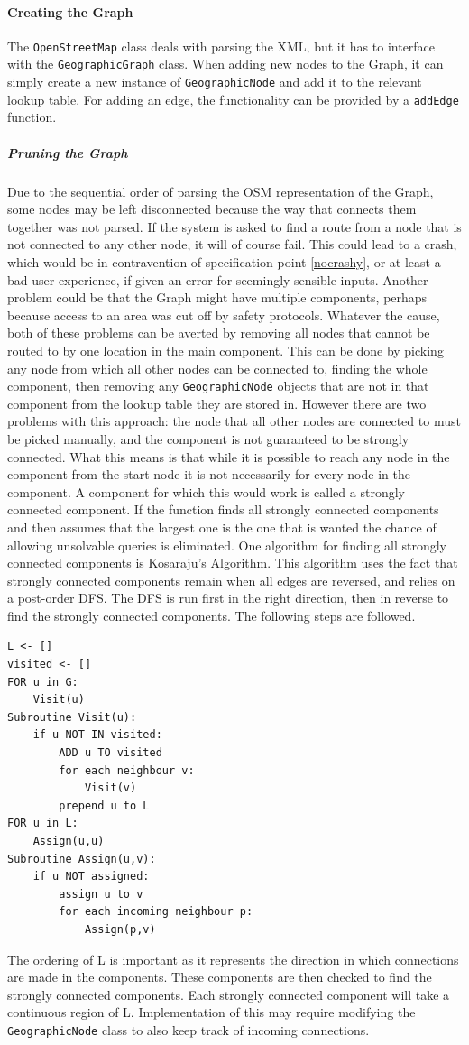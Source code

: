 \documentclass[11pt,twoside,a4paper]{article}
\begin{document}
\paragraph{Creating the Graph}
The \texttt{OpenStreetMap} class deals with parsing the XML, but it has to interface with the \texttt{GeographicGraph} class. When adding new nodes to the Graph, it can simply create a new instance of 
\texttt{GeographicNode} and add it to the relevant lookup table. For adding an edge, the functionality can be provided by a \texttt{addEdge} function. 
\subparagraph{Pruning the Graph}
Due to the sequential order of parsing the OSM representation of the Graph, some nodes may be left disconnected because the way that connects them together was not parsed. If the system is asked to find a route from a 
node that is not connected to any other node, it will of course fail. This could lead to a crash, which would be in contravention of specification point \ref{nocrashy}, or at least a bad user experience, if given an error for seemingly sensible inputs.
Another problem could be that the Graph might have multiple components, perhaps because access to an area was cut off by safety protocols. Whatever the cause, both of these problems can be averted by removing all nodes that cannot be routed to by one location in the 
main component. This can be done by picking any node from which all other nodes can be connected to, finding the whole component, then removing any \texttt{GeographicNode} objects that are not in that component from the lookup table they are stored in. However there are two problems with this approach:
 the node that all other nodes are connected to must be picked manually, and the component is not guaranteed to be strongly connected. What this means is that while it is possible to reach any node in the component from the start node it is not necessarily for every node in the component. 
A component for which this would work is called a strongly connected component. If the function finds all strongly connected components and then assumes that the largest one is the one that is wanted the chance of allowing unsolvable queries is eliminated. 
One algorithm for finding all strongly connected components is Kosaraju's Algorithm\cite{wikipedia_2022}. This algorithm uses the fact that strongly connected components remain when all edges are reversed, and relies on a post-order DFS. The DFS is run first in the right direction, then in reverse to find the strongly connected components.
The following steps are followed.
\begin{lstlisting}
L <- []
visited <- []
FOR u in G:
    Visit(u)
Subroutine Visit(u):
    if u NOT IN visited:
        ADD u TO visited
        for each neighbour v:
            Visit(v)
        prepend u to L
FOR u in L:
    Assign(u,u)
Subroutine Assign(u,v):
    if u NOT assigned:
        assign u to v
        for each incoming neighbour p:
            Assign(p,v)
\end{lstlisting}
The ordering of L is important as it represents the direction in which connections are made in the components. These components are then checked to find the strongly connected components. Each strongly connected component will take a continuous region of L. 
Implementation of this may require modifying the \texttt{GeographicNode} class to also keep track of incoming connections.  
\end{document}
